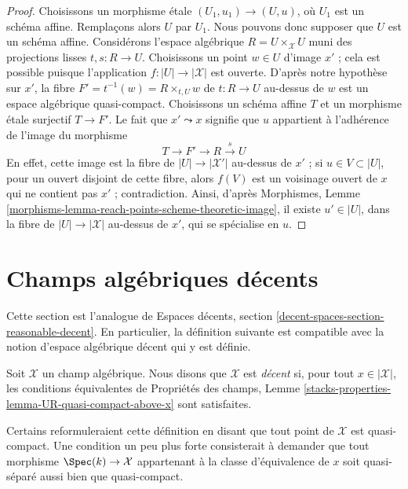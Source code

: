 \begin{proof}
Choisissons un morphisme \'etale $(U_1, u_1) \to (U, u)$, où $U_1$
est un schéma affine. Remplaçons alors $U$ par $U_1$.
Nous pouvons donc supposer que $U$ est un schéma affine.
Considérons l'espace algébrique $R = U \times_\mathcal{X} U$
muni des projections lisses $t, s : R \to U$.
Choisissons un point $w \in U$ d'image $x'$ ; cela est possible puisque
l'application $f : |U| \to |\mathcal{X}|$ est ouverte.
D'après notre hypothèse sur $x'$, la fibre
$F' = t^{-1}(w) = R \times_{t, U} w$
de $t : R \to U$ au-dessus de $w$ est un espace algébrique quasi-compact.
Choisissons un schéma affine $T$ et un morphisme \'etale surjectif
$T \to F'$. Le fait que $x' \leadsto x$ signifie que $u$ appartient à
l'adhérence de l'image du morphisme
$$
T \to F' \to R \xrightarrow{s} U
$$
En effet, cette image est la fibre de $|U| \to |\mathcal{X}'|$
au-dessus de $x'$ ; si $u \in V \subset |U|$, pour un ouvert disjoint
de cette fibre, alors $f(V)$ est un voisinage ouvert de $x$
qui ne contient pas $x'$ ; contradiction.
Ainsi, d'après Morphismes, Lemme
\ref{morphisms-lemma-reach-points-scheme-theoretic-image},
il existe $u' \in |U|$, dans la fibre
de $|U| \to |\mathcal{X}|$ au-dessus de $x'$, qui se spécialise en $u$.
\end{proof}


\section{Champs algébriques décents}
\label{section-reasonable-decent}

\noindent
Cette section est l'analogue de
Espaces décents, section \ref{decent-spaces-section-reasonable-decent}.
En particulier, la définition suivante est compatible avec
la notion d'espace algébrique décent qui y est définie.

\begin{definition}
\label{definition-decent}
Soit $\mathcal{X}$ un champ algébrique. Nous disons que $\mathcal{X}$ est
{\it décent} si, pour tout $x \in |\mathcal{X}|$, les conditions équivalentes
de Propriétés des champs, Lemme
\ref{stacks-properties-lemma-UR-quasi-compact-above-x} sont satisfaites.
\end{definition}

\noindent
Certains reformuleraient cette définition en disant que
tout point de $\mathcal{X}$ est quasi-compact.
Une condition un peu plus forte consisterait à demander que tout morphisme
$\Spec(k) \to \mathcal{X}$ appartenant à la classe d'équivalence de $x$ soit
quasi-séparé aussi bien que quasi-compact.

